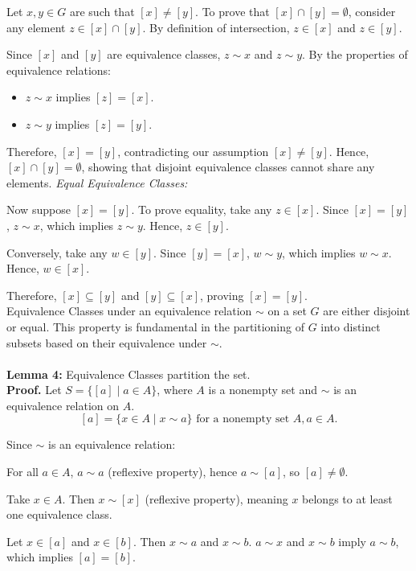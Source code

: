 Let \( x, y \in G \) are such that \( [x] \neq [y] \). To prove that \( [x] \cap [y] = \emptyset \), consider any element \( z \in [x] \cap [y] \). By definition of intersection, \( z \in [x] \) and \( z \in [y] \).

Since \( [x] \) and \( [y] \) are equivalence classes, \( z \sim x \) and \( z \sim y \). By the properties of equivalence relations:
\begin{itemize}
    \item \( z \sim x \) implies \( [z] = [x] \).
    \item \( z \sim y \) implies \( [z] = [y] \).
\end{itemize}
Therefore, \( [x] = [y] \), contradicting our assumption \( [x] \neq [y] \). Hence, \( [x] \cap [y] = \emptyset \), showing that disjoint equivalence classes cannot share any elements.
\textit{Equal Equivalence Classes:}

Now suppose \( [x] = [y] \). To prove equality, take any \( z \in [x] \). Since \( [x] = [y] \), \( z \sim x \), which implies \( z \sim y \). Hence, \( z \in [y] \).

Conversely, take any \( w \in [y] \). Since \( [y] = [x] \), \( w \sim y \), which implies \( w \sim x \). Hence, \( w \in [x] \).

Therefore, \( [x] \subseteq [y] \) and \( [y] \subseteq [x] \), proving \( [x] = [y] \).\\
Equivalence Classes under an equivalence relation \( \sim \) on a set \( G \) are either disjoint or equal. This property is fundamental in the partitioning of \( G \) into distinct subsets based on their equivalence under \( \sim \).
\\\\
\textbf{Lemma 4: }Equivalence Classes partition the set.
\\
\textbf{Proof.}
Let \( S = \{ [a] \mid a \in A \} \), where \( A \) is a nonempty set and \( \sim \) is an equivalence relation on \( A \).
\[ [a] = \{ x \in A \mid x \sim a \} \text{ for a nonempty set } A, a \in A. \]

Since \( \sim \) is an equivalence relation:

For all \( a \in A \), \( a \sim a \) (reflexive property), hence \( a \sim [a] \), so \( [a] \neq \emptyset \).

Take \( x \in A \). Then \( x \sim [x] \) (reflexive property), meaning \( x \) belongs to at least one equivalence class.

Let \( x \in [a] \) and \( x \in [b] \). Then \( x \sim a \) and \( x \sim b \).
\( a \sim x \) and \( x \sim b \) imply \( a \sim b \), which implies \( [a] = [b] \).

